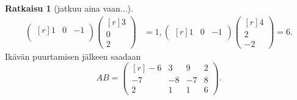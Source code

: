 \documentclass[12pt, a4paper, t]{beamer}
\theoremstyle{exercise}
\theoremstyle{remark}
\theoremstyle{definition}
\newtheorem*{rat}{Ratkaisu}
\begin{document}
\begin{frame}
\vspace{90pt}
\begin{rat}[jatkuu aina vaan...]
\begin{align*}
\begin{pmatrix*}[r]
1 & 0 &-1\\
\end{pmatrix*}
\begin{pmatrix*}[r]
3\\
0\\
2
\end{pmatrix*}&=1, \begin{pmatrix*}[r]
1 & 0 &-1
\end{pmatrix*}
\begin{pmatrix*}[r]
4\\
2\\
-2
\end{pmatrix*}=6.
\end{align*}
Ikävän puurtamisen jälkeen saadaan 
$$
AB=\begin{pmatrix*}[r]
-6 & 3 & 9 & 2\\
-7 & -8 & -7 & 8\\
2 & 1 & 1& 6
\end{pmatrix*}.
$$
\end{rat}
\end{frame}
\end{document}
